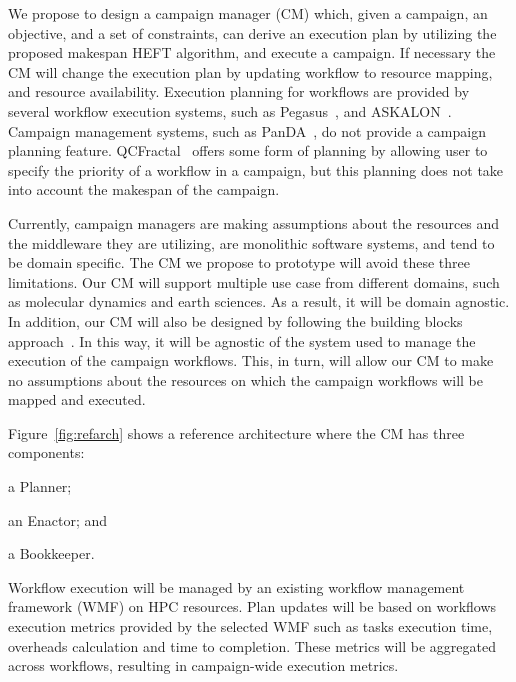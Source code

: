 We propose to design a campaign manager (CM) which, given a campaign, an objective, and a set of constraints, can derive an execution plan by utilizing the proposed makespan HEFT algorithm, and execute a campaign.
If necessary the CM will change the execution plan by updating workflow to resource mapping, and resource availability.
Execution planning for workflows are provided by several workflow execution systems, such as Pegasus~\cite{deelman2015pegasus}, and ASKALON~\cite{fahringer2005askalon}.
Campaign management systems, such as PanDA~\cite{maeno2008panda}, do not provide a campaign planning feature.
QCFractal~\cite{qcfractal} offers some form of planning by allowing user to specify the priority of a workflow in a campaign, but this planning does not take into account the makespan of the campaign.


Currently, campaign managers are making assumptions about the resources and the middleware they are utilizing, are monolithic software systems, and tend to be domain specific.
The CM we propose to prototype will avoid these three limitations. 
Our CM will support multiple use case from different domains, such as molecular dynamics and earth sciences.
As a result, it will be domain agnostic.
In addition, our CM will also be designed by following the building blocks approach~\cite{turilli2019middleware}. 
In this way, it will be agnostic of the system used to manage the execution of the campaign workflows.
This, in turn, will allow our CM to make no assumptions about the resources on which the campaign workflows will be mapped and executed.

Figure~\ref{fig:refarch} shows a reference architecture where the CM has three components:
\begin{inparaenum}[(1)]
\item a Planner;
\item an Enactor; and
\item a Bookkeeper. 
\end{inparaenum}
Workflow execution will be managed by an existing workflow management framework (WMF) on HPC resources.
Plan updates will be based on workflows execution metrics provided by the selected WMF such as tasks execution time, overheads calculation and time to completion.
These metrics will be aggregated across workflows, resulting in campaign-wide execution metrics.

